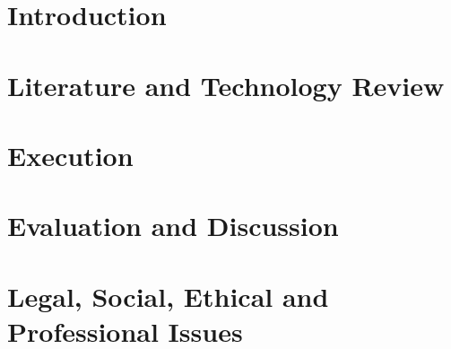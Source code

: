 \documentclass[12pt]{article}
\begin{document}
\begin{abstract}
\end{abstract}

\newpage
\tableofcontents
\listoftables
\listoffigures
\newpage

\section{Introduction}

\section{Literature and Technology Review}

\section{Execution}

\section{Evaluation and Discussion}

\section{Legal, Social, Ethical and Professional Issues}
\end{document}
